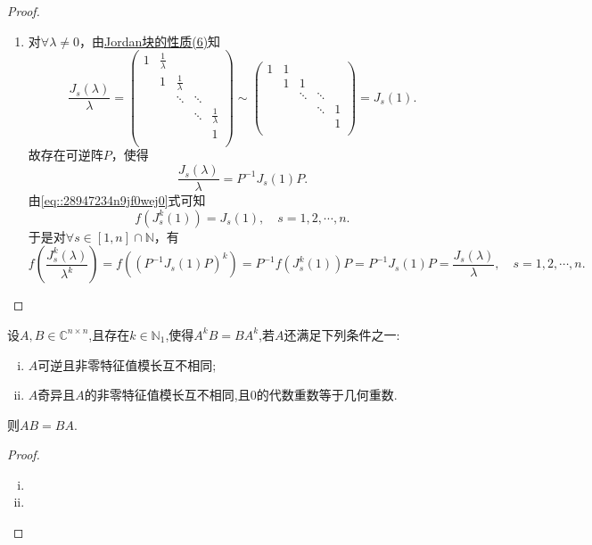 \documentclass[../../main.tex]{subfiles}
\begin{document}
\begin{proof}
\begin{enumerate}[(1)]
\item 对$\forall \lambda \ne 0$，由\hyperref[proposition:Jordan块的性质]{Jordan块的性质(6)}知
\[
\frac{J_s\left( \lambda \right)}{\lambda}=\begin{pmatrix}
1&		\frac{1}{\lambda}&		&		&		\\
&		1&		\frac{1}{\lambda}&		&		\\
&		&		\ddots&		\ddots&		\\
&		&		&		\ddots&		\frac{1}{\lambda}\\
&		&		&		&		1\\
\end{pmatrix} \sim \begin{pmatrix}
1&		1&		&		&		\\
&		1&		1&		&		\\
&		&		\ddots&		\ddots&		\\
&		&		&		\ddots&		1\\
&		&		&		&		1\\
\end{pmatrix} =J_s\left( 1 \right) .
\]
故存在可逆阵$P$，使得
\[
\frac{J_s\left( \lambda \right)}{\lambda}=P^{-1}J_s\left( 1 \right) P.
\]
由\eqref{eq::28947234n9jf0wej0}式可知
\[
f\left( J_{s}^{k}\left( 1 \right) \right) =J_s\left( 1 \right) ,\quad s=1,2,\cdots ,n.
\]
于是对$\forall s\in \left[ 1,n \right] \cap \mathbb{N}$，有
\[
f\left( \frac{J_{s}^{k}\left( \lambda \right)}{\lambda ^k} \right) =f\left( \left( P^{-1}J_s\left( 1 \right) P \right) ^k \right) =P^{-1}f\left( J_{s}^{k}\left( 1 \right) \right) P=P^{-1}J_s\left( 1 \right) P=\frac{J_s\left( \lambda \right)}{\lambda},\quad s=1,2,\cdots ,n.
\]
\end{enumerate}

\end{proof}

\begin{corollary}
设$A,B\in \mathbb{C} ^{n\times n}$,且存在$k\in \mathbb{N} _1$,使得$A^kB=BA^k$,若$A$还满足下列条件之一:
\begin{enumerate}[(i)]
\item $A$可逆且非零特征值模长互不相同;

\item $A$奇异且$A$的非零特征值模长互不相同,且0的代数重数等于几何重数.
\end{enumerate}
则$AB=BA.$
\end{corollary}
\begin{proof}
\begin{enumerate}[(i)]
\item 

\item 
\end{enumerate}
\end{proof}
\end{document}
